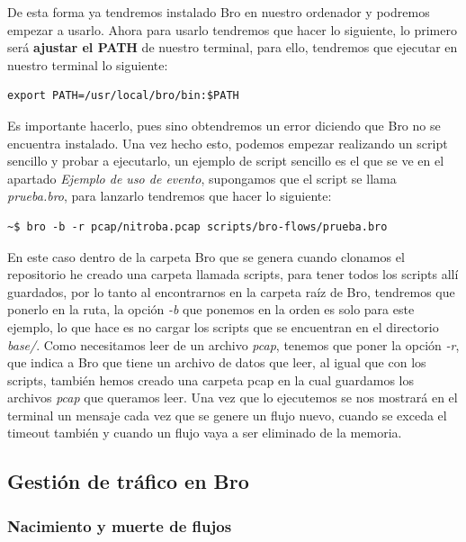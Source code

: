 \noindent De esta forma ya tendremos instalado Bro en nuestro ordenador y podremos empezar 
a usarlo.
\intro
Ahora para usarlo tendremos que hacer lo siguiente, lo primero será \textbf{ajustar el 
PATH} de nuestro terminal, para ello, tendremos que ejecutar en nuestro terminal 
lo siguiente:
\intro
\begin{lstlisting}[style=Consola]
export PATH=/usr/local/bro/bin:$PATH
\end{lstlisting}

\noindent Es importante hacerlo, pues sino obtendremos un error diciendo que Bro no se 
encuentra instalado. Una vez hecho esto, podemos empezar realizando un script 
sencillo y probar a ejecutarlo, un ejemplo de script sencillo es el que se ve 
en el apartado \textit{Ejemplo  de uso de evento}, 
supongamos que el script se llama \textit{prueba.bro}, para lanzarlo tendremos 
que hacer lo siguiente:
\intro
\begin{lstlisting}[style=Consola]
~$ bro -b -r pcap/nitroba.pcap scripts/bro-flows/prueba.bro
\end{lstlisting}

\noindent En este caso dentro de la carpeta Bro que se genera cuando clonamos el 
repositorio he creado una carpeta llamada scripts, para tener todos los 
scripts allí guardados, por lo tanto al encontrarnos en la carpeta raíz 
de Bro, tendremos que ponerlo en la ruta, la opción \textit{-b} que ponemos en la 
orden es solo para este ejemplo, lo que hace es no cargar los scripts 
que se encuentran en el directorio \textit{base/}. Como necesitamos leer de un 
archivo \textit{pcap}, tenemos que poner la opción \textit{-r}, que indica a Bro que tiene 
un archivo de datos que leer, al igual que con los scripts, también hemos 
creado una carpeta pcap en la cual guardamos los archivos \textit{pcap} que queramos 
leer. Una vez que lo ejecutemos se nos mostrará en el terminal un mensaje 
cada vez que se genere un flujo nuevo, cuando se exceda el timeout también 
y cuando un flujo vaya a ser eliminado de la memoria.

\subsection{Gestión de tráfico en Bro}

\subsubsection{Nacimiento y muerte de flujos}

